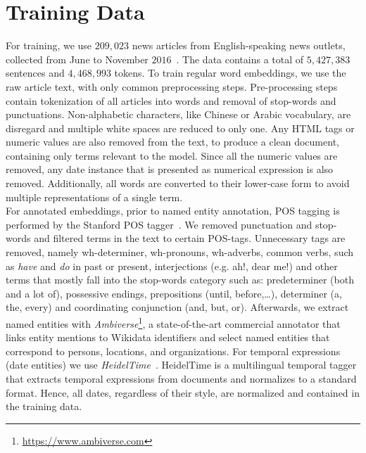 \section{Training Data}\label{sec:data}
For training, we use $209,023$ news articles from English-speaking news outlets, collected from June to November $2016$~. The data contains a total of $5,427,383$ sentences and $4,468,993$ tokens. To train regular word embeddings, we use the raw article text, with only common preprocessing steps. Pre-processing steps contain tokenization of all articles into words and removal of stop-words and punctuations. Non-alphabetic characters, like Chinese or Arabic vocabulary, are disregard and multiple white spaces are reduced to only one. Any HTML tags or numeric values are also removed from the text, to produce a clean document, containing only terms relevant to the model. Since all the numeric values are removed, any date instance that is presented as numerical expression is also removed. Additionally, all words are converted to their lower-case form to avoid multiple representations of a single term.\\
For annotated embeddings, prior to named entity annotation, POS tagging is performed by the Stanford POS tagger~. 
We removed punctuation and stop-words and filtered terms in the text to  certain POS-tags. Unnecessary tags are removed, namely  wh-determiner, wh-pronouns, wh-adverbs, common verbs, such as \emph{have} and \emph{do} in past or present, interjections (e.g. ah!, dear me!) and other terms that mostly fall into the stop-words category such as: predeterminer (both and a lot of), possessive endings, prepositions (until, before,\dots), determiner (a, the, every) and coordinating conjunction (and, but, or). Afterwards, we extract named entities with \emph{Ambiverse}\footnote{\url{https://www.ambiverse.com}}, a state-of-the-art commercial annotator that links entity mentions to Wikidata identifiers and select named entities that correspond to persons, locations, and organizations. For temporal expressions (date entities) we use \emph{HeidelTime}~. HeidelTime is a multilingual temporal tagger that extracts temporal expressions from documents and normalizes to a standard format. Hence, all dates, regardless of their style, are normalized and contained in the training data.\\
